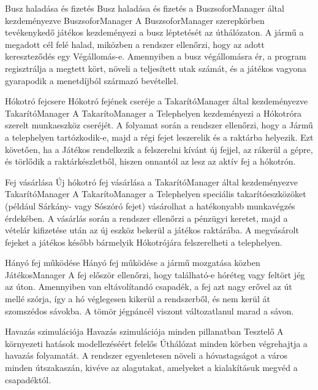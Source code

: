 \begin{use-case}
    {Busz haladása és fizetés}
    {Busz haladása és fizetés a BuszsoforManager által kezdeményezve}
    {BuszsoforManager}
    A BuszsoforManager szerepkörben tevékenykedő játékos kezdeményezi a busz léptetését az úthálózaton. A jármű a megadott cél felé halad, miközben a rendszer ellenőrzi, hogy az adott kereszteződés egy Végállomás-e. Amennyiben a busz végállomásra ér, a program regisztrálja a megtett kört, növeli a teljesített utak számát, és a játékos vagyona gyarapodik a menetdíjból származó bevétellel.
\end{use-case}

\begin{use-case}
    {Hókotró fejcsere}
    {Hókotró fejének cseréje a TakarítóManager által kezdeményezve}
    {TakarítóManager}
    A TakarítoManager a Telephelyen kezdeményezi a Hókotróra szerelt munkaeszköz cseréjét. A folyamat során a rendszer ellenőrzi, hogy a Jármű a telephelyen tartózkodik-e, majd a régi fejet leszerelik és a raktárba helyezik. Ezt követően, ha a Játékos rendelkezik a felszerelni kívánt új fejjel, az rákerül a gépre, és törlődik a raktárkészletből, hiszen onnantól az lesz az aktív fej a hókotrón.
\end{use-case}

\begin{use-case}
    {Fej vásárlása}
    {Új hókotró fej vásárlása a TakarítóManager által kezdeményezve}
    {TakarítóManager}
    A TakarítoManager a Telephelyen speciális takarítóeszközöket (például Sárkány- vagy Sószóró fejet) vásárolhat a hatékonyabb munkavégzés érdekében. A vásárlás során a rendszer ellenőrzi a pénzügyi keretet, majd a vételár kifizetése után az új eszköz bekerül a játékos raktárába. A megvásárolt fejeket a játékos később bármelyik Hókotrójára felszerelheti a telephelyen.
\end{use-case}

\begin{use-case}
    {Hányó fej működése}
    {Hányó fej működése a jármű mozgatása közben}
    {JátékosManager}
    A fej először ellenőrzi, hogy található-e hóréteg vagy feltört jég az úton. Amennyiben van eltávolítandó csapadék, a fej azt nagy erővel az út mellé szórja, így a hó véglegesen kikerül a rendszerből, és nem kerül át szomszédos sávokba. A tömör jégpáncél viszont változatlanul marad a sávon. 
\end{use-case}

\begin{use-case}
    {Havazás szimulációja}
    {Havazás szimulációja minden pillanatban}
    {Tesztelő}
    A környezeti hatások modellezéséért felelős Úthálózat minden körben végrehajtja a havazás folyamatát. A rendszer egyenletesen növeli a hóvastagságot a város minden útszakaszán, kivéve az alagutakat, amelyeket a kialakításuk megvéd a csapadéktól. 
\end{use-case}


